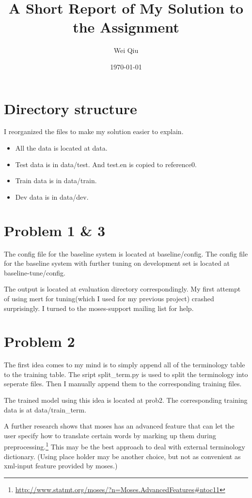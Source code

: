 \documentclass[a4paper]{article}
\title{A Short Report of My Solution to the Assignment}
\author{Wei Qiu}
\date{\today}
\begin{document}
\maketitle

\section{Directory structure}
I reorganized the files to make my solution easier to explain.
\begin{itemize}
    \item All the data is located at data.
    \item Test data is in data/test. And test.en is copied to reference0.
    \item Train data is in data/train. 
    \item Dev data is in data/dev.
\end{itemize}

\section{Problem 1 \& 3}
The config file  for the baseline system is located at  baseline/config.
The config file for the baseline system with further tuning on  development set is located at baseline-tune/config.

The output is located at evaluation directory correspondingly.
My first attempt of using mert for tuning(which I used for my previous project) crashed surprisingly. I turned to the moses-support mailing list for help.



\section{Problem 2}
The first idea comes to my mind is to simply append all of the terminology table to the training table. The sript split\_term.py is used to split the terminology into seperate files. Then I manually append them to the corresponding training files.

The trained model using this idea is located at prob2. The corresponding training data is at data/train\_term.

A further research shows that moses has an advanced feature that can let the user specify how to translate certain words by marking up them during preprocessing.\footnote{\url{http://www.statmt.org/moses/?n=Moses.AdvancedFeatures#ntoc11}}
This may be the best approach to deal with external terminology dictionary.  (Using place holder may be another choice, but not as convenient as xml-input feature provided by moses.)
\end{document}
